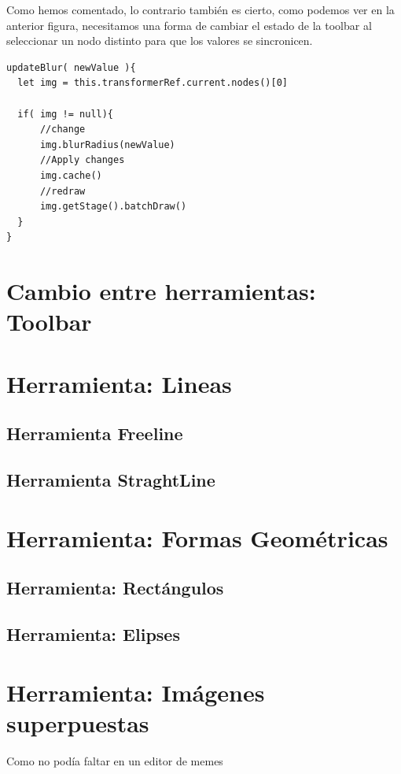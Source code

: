 Como hemos comentado, lo contrario también es cierto, como podemos ver en la anterior figura, 
necesitamos una forma de cambiar el estado de la toolbar al seleccionar un nodo distinto
para que los valores se sincronicen.

\newpage

\begin{lstlisting}[caption={Ejemplo de una función updater de la propiedad de un nodo}]
updateBlur( newValue ){
  let img = this.transformerRef.current.nodes()[0]

  if( img != null){
      //change
      img.blurRadius(newValue)
      //Apply changes
      img.cache()
      //redraw
      img.getStage().batchDraw()
  }
}
\end{lstlisting}


\section{Cambio entre herramientas: Toolbar}



\section{Herramienta: Lineas}
  \subsection{Herramienta Freeline}
  \subsection{Herramienta StraghtLine}
\section{Herramienta: Formas Geométricas}
  \subsection{Herramienta: Rectángulos}
  \subsection{Herramienta: Elipses}
\section{Herramienta: Imágenes superpuestas}
Como no podía faltar en un editor de memes


